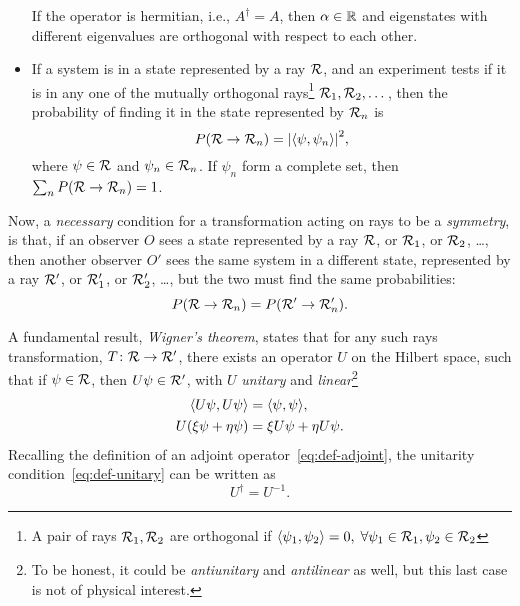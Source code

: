 \begin{itemize}
    If the operator is hermitian, i.e., $A^\dagger = A$, then $\alpha \in \mathbb{R}$ and eigenstates with different eigenvalues are orthogonal with respect to each other.
    \item If a system is in a state represented by a ray $\mathcal{R}$, and an experiment tests if it is in any one of the  mutually orthogonal rays\footnote{A pair of rays $\mathcal{R}_1, \mathcal{R}_2$ are orthogonal if $\langle \psi_1, \psi_2 \rangle = 0, \; \forall \psi_1 \in \mathcal{R}_1,  \psi_2 \in \mathcal{R}_2$} $\mathcal{R}_1, \mathcal{R}_2, \dots$, then the probability of finding it in the state represented by $\mathcal{R}_n$ is 
    \begin{equation}
        P(\mathcal{R} \to \mathcal{R}_n) = \abs{\langle \psi, \psi_n \rangle}^2 ,
    \end{equation}
    where $\psi \in \mathcal{R}$ and $\psi_n \in \mathcal{R}_n$. If $\psi_n$ form a complete set, then $\sum_n P(\mathcal{R} \to \mathcal{R}_n) = 1$.
\end{itemize}

Now, a \emph{necessary} condition for a transformation acting on rays to be a \emph{symmetry}, is that, if an observer $O$ sees a state represented by a ray $\mathcal{R}$, or $\mathcal{R}_1$, or $\mathcal{R}_2$, \dots, then another observer $O'$ sees the same system in a different state, represented by a ray $\mathcal{R}'$, or $\mathcal{R}'_1$, or $\mathcal{R}'_2$, \dots, but the two must find the same probabilities:
\begin{equation}
    P(\mathcal{R} \to \mathcal{R}_n) = P(\mathcal{R}' \to \mathcal{R}'_n) .
\end{equation}

A fundamental result, \emph{Wigner's theorem}, states that for any such rays transformation, $T \colon \mathcal{R} \to \mathcal{R}'$, there exists an operator $U$ on the Hilbert space, such that if $\psi \in \mathcal{R}$, then $U\psi \in \mathcal{R}'$, with $U$ \emph{unitary} and \emph{linear}\footnote{To be honest, it could be \emph{antiunitary} and \emph{antilinear} as well, but this last case is not of physical interest.}
\begin{subequations}
\begin{align}
    \langle U\psi, U\psi \rangle &= \langle \psi, \psi \rangle \label{eq:def-unitary} ,\\ 
    U(\xi \psi + \eta \psi) &= \xi U \psi + \eta U \psi .
\end{align}
\end{subequations}
Recalling the definition of an adjoint operator~\eqref{eq:def-adjoint}, the unitarity condition~\eqref{eq:def-unitary} can be written as
\begin{equation}
    U^\dagger = U^{-1} .
\end{equation}

